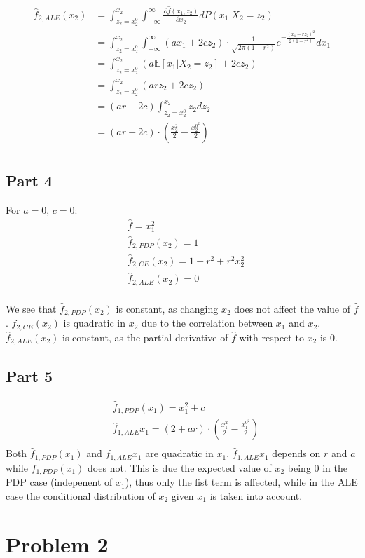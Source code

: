 \documentclass{article}
\begin{document}
\begin{align*}
    \hat{f}_{2,ALE}(x_2) &= \int_{z_2 = x_2^0}^{x_2}\int_{-\infty}^{\infty}\frac{\partial\hat{f}(x_1,z_2)}{\partial x_2}dP(x_1|X_2=z_2) \\
    &= \int_{z_2 = x_2^0}^{x_2}\int_{-\infty}^{\infty}(ax_1 + 2cz_2) \cdot \frac{1}{\sqrt{2\pi(1-r^2)}}e^{-\frac{(x_1 - rz_2)^2}{2(1-r^2)}}dx_1 \\
    &= \int_{z_2 = x_2^0}^{x_2}(a\mathbb{E}[x_1 | X_2 = z_2] + 2cz_2) \\
    &= \int_{z_2 = x_2^0}^{x_2}(arz_2 + 2cz_2) \\
    &= (ar + 2c)\int_{z_2 = x_2^0}^{x_2}z_2 dz_2 \\
    &= (ar + 2c) \cdot (\frac{x_2^2}{2} - \frac{x_2^{0^2}}{2}) \\
\end{align*}

\subsection{Part 4}
For $a=0$, $c=0$: \\
\begin{align*}
    &\hat{f} = x_1^2 \\
    &\hat{f}_{2,PDP}(x_2) = 1 \\
    &\hat{f}_{2,CE}(x_2) = 1 - r^2 + r^2x_2^2 \\
    &\hat{f}_{2,ALE}(x_2) = 0 \\
\end{align*}

We see that $\hat{f}_{2,PDP}(x_2)$ is constant, as changing $x_2$ does not affect the value of $\hat{f}$. $\hat{f}_{2,CE}(x_2)$ is quadratic in $x_2$ due to the correlation between $x_1$ and $x_2$. $\hat{f}_{2,ALE}(x_2)$ is constant, as the partial derivative of $\hat{f}$ with respect to $x_2$ is 0.

\subsection{Part 5}
\begin{align*}
    &\hat{f}_{1,PDP}(x_1) = x_1^2 + c \\
    &\hat{f}_{1,ALE}{x_1} = (2 + ar) \cdot (\frac{x_1^2}{2} - \frac{x_1^{0^2}}{2}) \\
\end{align*}
Both $\hat{f}_{1,PDP}(x_1)$ and $\hat{f}_{1,ALE}{x_1}$ are quadratic in $x_1$. $\hat{f}_{1,ALE}{x_1}$ depends on $r$ and $a$ while $\hat{f}_{1,PDP}(x_1)$ does not. This is due the expected value of $x_2$ being 0 in the PDP case (indepenent of $x_1$), thus only the fist term is affected, while in the ALE case the conditional distribution of $x_2$ given $x_1$ is taken into account.
\section{Problem 2}
\end{document}
